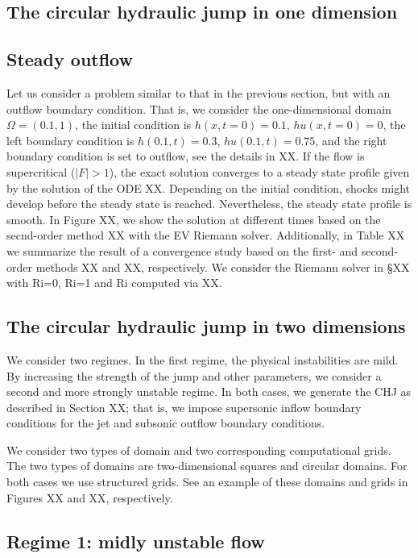 \documentclass[preprint, 11pt]{article}
\begin{document}
\subsection{The circular hydraulic jump in one dimension}

\subsection{Steady outflow}
Let us consider a problem similar to that in the previous section, but with an outflow boundary condition. 
That is, we consider the one-dimensional domain $\Omega=(0.1,1)$, the initial condition is 
$h(x,t=0)=0.1$, $hu(x,t=0)=0$, the left boundary condition is $h(0.1,t)=0.3$, $hu(0.1,t)=0.75$, 
and the right boundary condition is set to outflow, see the details in XX. 
If the flow is supercritical ($|F|>1$), the exact solution converges to a 
steady state profile given by the solution of the ODE XX. 
Depending on the initial condition, shocks might develop before the steady state is reached. 
Nevertheless, the steady state profile is smooth. 
In Figure XX, we show the solution at different times based on the secnd-order method XX with 
the EV Riemann solver. Additionally, in Table XX we summarize the result of a convergence study 
based on the first- and second-order methods XX and XX, respectively. 
We consider the Riemann solver in \S XX with Ri=0, Ri=1 and Ri computed via XX. 


\subsection{The circular hydraulic jump in two dimensions}
We consider two regimes. In the first regime, the physical instabilities are mild. 
By increasing the strength of the jump and other parameters, we consider a second 
and more strongly unstable regime. In both cases, we generate the CHJ as described in 
Section XX; that is, we impose supersonic inflow boundary conditions for the jet and 
subsonic outflow boundary conditions. 

We consider two types of domain and two corresponding computational grids. 
The two types of domains are two-dimensional squares and circular domains. 
For both cases we use structured grids. See an example of these domains and grids in Figures XX and XX, 
respectively.

\subsection{Regime 1: midly unstable flow}
\end{document}
